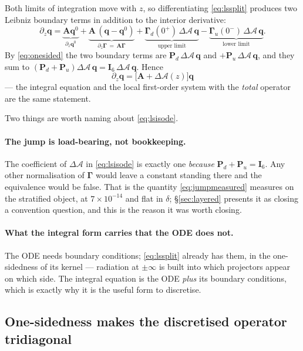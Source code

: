\documentclass[11pt,a4paper]{article}
\newcommand{\bA}{\mathbf{A}}
\newcommand{\bq}{\mathbf{q}}
\newcommand{\bP}{\mathbf{P}}
\newcommand{\dA}{\Delta\mathcal{A}}
\newcommand{\Isix}{\mathbf{I}_{6}}
\begin{document}
Both limits of integration move with $z$, so differentiating
\eqref{eq:lssplit} produces two Leibniz boundary terms in addition to the
interior derivative:
\begin{equation}\label{eq:leibniz}
  \partial_z\bq =
  \underbrace{\bA\bq^{0}}_{\partial_z\bq^{0}}
  + \underbrace{\bA\,(\bq-\bq^{0})}_{\partial_z\boldsymbol\Gamma\,=\,\bA\boldsymbol\Gamma}
  + \underbrace{\boldsymbol\Gamma_{d}(0^{+})\,\dA\,\bq}_{\text{upper limit}}
  - \underbrace{\boldsymbol\Gamma_{u}(0^{-})\,\dA\,\bq}_{\text{lower limit}} .
\end{equation}
By \eqref{eq:onesided} the two boundary terms are $\bP_d\,\dA\,\bq$ and
$+\bP_u\,\dA\,\bq$, and they sum to $(\bP_d+\bP_u)\dA\,\bq = \Isix\,\dA\,\bq$.
Hence
\begin{equation}\label{eq:lsisode}
  \boxed{\;\partial_z\bq = \bigl[\bA + \dA(z)\bigr]\bq\;}
\end{equation}
--- the integral equation and the local first-order system with the \emph{total}
operator are the same statement.

Two things are worth naming about \eqref{eq:lsisode}.

\paragraph{The jump is load-bearing, not bookkeeping.}  The coefficient of
$\dA$ in \eqref{eq:lsisode} is exactly one \emph{because} $\bP_d+\bP_u = \Isix$.
Any other normalisation of $\boldsymbol\Gamma$ would leave a constant standing
there and the equivalence would be false.  That is the quantity
\eqref{eq:jumpmeasured} measures on the stratified object, at
$7\times10^{-14}$ and flat in $\delta$; \S\ref{sec:layered} presents it as
closing a convention question, and this is the reason it was worth closing.

\paragraph{What the integral form carries that the ODE does not.}  The ODE needs
boundary conditions; \eqref{eq:lssplit} already has them, in the one-sidedness of
its kernel --- radiation at $\pm\infty$ is built into which projectors appear on
which side.  The integral equation is the ODE \emph{plus} its boundary
conditions, which is exactly why it is the useful form to discretise.

\subsection{One-sidedness makes the discretised operator tridiagonal}\label{sec:onesided}
\end{document}

